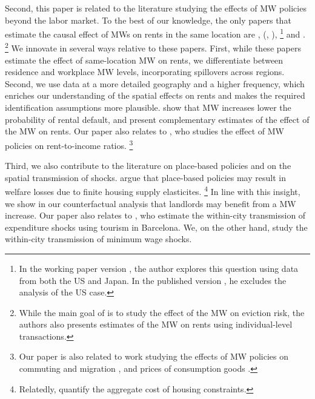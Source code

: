 Second, this paper is related to the literature studying the effects of MW 
policies beyond the labor market.
To the best of our knowledge, the only papers that estimate the causal effect 
of MWs on rents in the same location are \textcite{Tidemann2018}, 
\citeauthor{Yamagishi2019} (\cite*{Yamagishi2019}, \cite*{Yamagishi2021}),%
\footnote{In the working paper version \parencite{Yamagishi2019}, the author 
explores this question using data from both the US and Japan.
In the published version \parencite{Yamagishi2021}, he excludes the analysis of 
the US case.}
and \textcite{AgarwalEtAl2021}.%
\footnote{While the main goal of \textcite{AgarwalEtAl2021} is to study the 
effect of the MW on eviction risk, the authors also presents estimates of the
MW on rents using individual-level transactions.}
We innovate in several ways relative to these papers.
First, while these papers estimate the effect of same-location MW on rents, we 
differentiate between residence and workplace MW levels, incorporating
spillovers across regions.
Second, we use data at a more detailed geography and a higher frequency, which
enriches our understanding of the spatial effects on rents and makes the 
required identification assumptions more plausible.
\textcite{AgarwalEtAl2021} show that MW increases lower the probability of 
rental default, and present complementary estimates of the effect of the MW 
on rents.
Our paper also relates to \textcite{Hughes2020}, who studies the effect of 
MW policies on rent-to-income ratios.%
\footnote{Our paper is also related to work studying the effects of MW policies 
on commuting and migration \parencite{Cadena2014, Monras2019, PerezPerez2021}, and 
prices of consumption goods \parencite{AllegrettoReich2018, Leung2021}.}

Third, we also contribute to the literature on place-based policies and 
on the spatial transmission of shocks.
\textcite{KlineMoretti2014} argue that place-based policies may result in 
welfare losses due to finite housing supply elasticites.%
\footnote{Relatedly, \textcite{HsiehMoretti2019} quantify the aggregate cost 
of housing constraints.}
In line with this insight, we show in our counterfactual analysis that landlords
may benefit from a MW increase.
Our paper also relates to \textcite{AllenEtAl2020}, who estimate the 
within-city transmission of expenditure shocks using tourism in Barcelona.
We, on the other hand, study the within-city transmission of minimum wage shocks.

